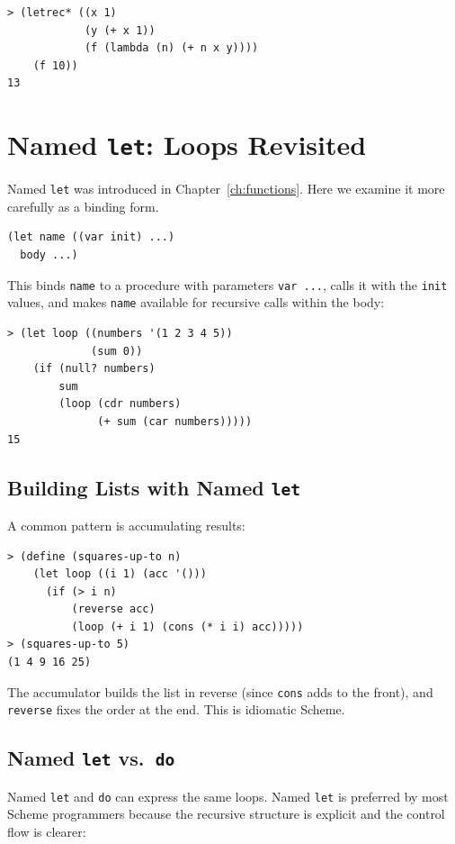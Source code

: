 \begin{lstlisting}[style=repl]
> (letrec* ((x 1)
            (y (+ x 1))
            (f (lambda (n) (+ n x y))))
    (f 10))
13
\end{lstlisting}

\section{Named \texttt{let}: Loops Revisited}

Named \texttt{let} was introduced in Chapter~\ref{ch:functions}. Here we examine it more carefully as a binding form.

\begin{lstlisting}
(let name ((var init) ...)
  body ...)
\end{lstlisting}

This binds \texttt{name} to a procedure with parameters \texttt{var ...}, calls it with the \texttt{init} values, and makes \texttt{name} available for recursive calls within the body:

\begin{lstlisting}[style=repl]
> (let loop ((numbers '(1 2 3 4 5))
             (sum 0))
    (if (null? numbers)
        sum
        (loop (cdr numbers)
              (+ sum (car numbers)))))
15
\end{lstlisting}

\subsection{Building Lists with Named \texttt{let}}

A common pattern is accumulating results:

\begin{lstlisting}[style=repl]
> (define (squares-up-to n)
    (let loop ((i 1) (acc '()))
      (if (> i n)
          (reverse acc)
          (loop (+ i 1) (cons (* i i) acc)))))
> (squares-up-to 5)
(1 4 9 16 25)
\end{lstlisting}

The accumulator builds the list in reverse (since \texttt{cons} adds to the front), and \texttt{reverse} fixes the order at the end. This is idiomatic Scheme.

\subsection{Named \texttt{let} vs.\ \texttt{do}}

Named \texttt{let} and \texttt{do} can express the same loops. Named \texttt{let} is preferred by most Scheme programmers because the recursive structure is explicit and the control flow is clearer:

